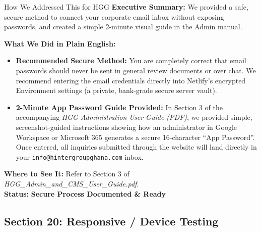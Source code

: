 \documentclass[11pt,a4paper]{article}
\begin{document}
\begin{DetailedResolutionBox}{How We Addressed This for HGG}
\textbf{Executive Summary:} We provided a safe, secure method to connect your corporate email inbox without exposing passwords, and created a simple 2-minute visual guide in the Admin manual.

\textbf{What We Did in Plain English:}
\begin{itemize}
    \item \textbf{Recommended Secure Method:} You are completely correct that email passwords should never be sent in general review documents or over chat. We recommend entering the email credentials directly into Netlify's encrypted Environment settings (a private, bank-grade secure server vault).
    \item \textbf{2-Minute App Password Guide Provided:} In Section 3 of the accompanying \textit{HGG Administration User Guide (PDF)}, we provided simple, screenshot-guided instructions showing how an administrator in Google Workspace or Microsoft 365 generates a secure 16-character ``App Password''. Once entered, all inquiries submitted through the website will land directly in your \texttt{info@hintergroupghana.com} inbox.
\end{itemize}

\textbf{Where to See It:} Refer to Section 3 of \textit{HGG\_Admin\_and\_CMS\_User\_Guide.pdf}. \\
\textbf{Status:} \textcolor{HGGGreen}{\textbf{Secure Process Documented \& Ready}}
\end{DetailedResolutionBox}

\vspace{0.3cm}

\subsection{Section 20: Responsive / Device Testing}
\end{document}
